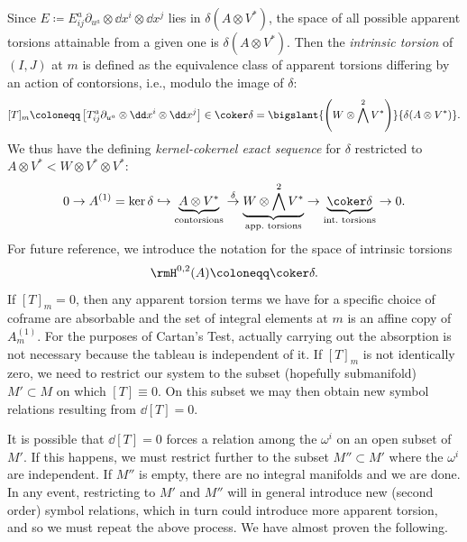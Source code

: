 Since $E\coloneqq E^a_{ij}\partial_{u^a}\otimes \dd x^i\otimes \dd x^j$ lies in $\delta(A\otimes V^\ast)$, the space of all possible apparent torsions attainable from a given one is $\delta(A\otimes V^\ast)$. Then the \emph{intrinsic torsion} of $(I,J)$ at $m$ is defined as the equivalence class of apparent torsions differing by an action of contorsions, i.e., modulo the image of $\delta$:
\[[T]_m\coloneqq \left[T^a_{ij}\partial_{u^a}\otimes \dd x^i\otimes \dd x^j\right]\in \coker\delta =\bigslant{\left(W\otimes \bigwedge^2V^\ast\right)}{\delta(A\otimes V^\ast)}.\]
We thus have the defining \emph{kernel-cokernel exact sequence} for $\delta$ restricted to $A\otimes V^\ast<W\otimes V^\ast\otimes V^\ast$:
\[0\to A^{(1)}=\ker\delta \hookrightarrow \underbrace{A\otimes V^\ast}_{\text{contorsions}}\overset{\delta}{\to}\underbrace{W\otimes\bigwedge^2 V^\ast}_{\text{app.\ torsions}}\to \underbrace{\coker\delta}_{\text{int.\ torsions}}\to 0.\]
For future reference, we introduce the notation for the space of intrinsic torsions
\[\rmH^{0,2}(A)\coloneqq \coker\delta.\]
If $[T]_m= 0$, then any apparent torsion terms we have for a specific choice of coframe are absorbable and the set of integral elements at $m$ is an affine copy of $A^{(1)}_m$. For the purposes of Cartan's Test, actually carrying out the absorption is not necessary because the tableau is independent of it. If $[T]_m$ is not identically zero, we need to restrict our system to the subset (hopefully submanifold) $M'\subset M$ on which $[T]\equiv 0$. On this subset we may then obtain new symbol relations resulting from $\dd [T]=0$.

It is possible that $\dd[T]=0$ forces a relation among the $\omega^i$ on an open subset of $M'$. If this happens, we must restrict further to the subset $M''\subset M'$ where the $\omega^i$ are independent. If $M''$ is empty, there are no integral manifolds and we are done. In any event, restricting to $M'$ and $M''$ will in general introduce new (second order) symbol relations, which in turn could introduce more apparent torsion, and so we must repeat the above process. We have almost proven the following.

